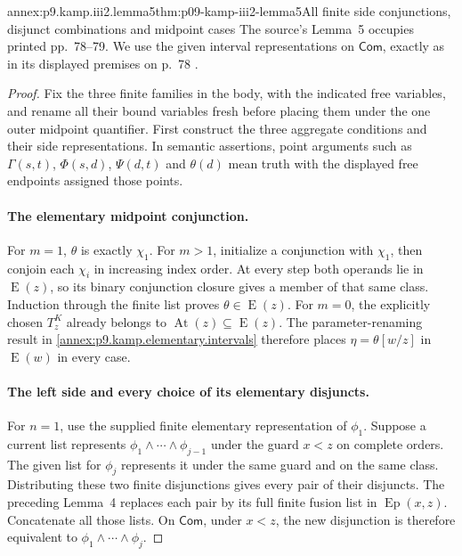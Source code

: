 \begin{annexitem}{annex:p9.kamp.iii2.lemma5}{thm:p09-kamp-iii2-lemma5}{All finite side conjunctions, disjunct combinations and midpoint cases}
The source's Lemma~5 occupies printed pp.~78--79. We use the given
interval representations on \(\mathsf{Com}\), exactly as in its
displayed premises on p.~78
\cite[ch.~III, pp.~78--79]{Kamp1968}.

\begin{proof}
Fix the three finite families in the body, with the indicated free
variables, and rename all their bound variables fresh before placing
them under the one outer midpoint quantifier. First construct the
three aggregate conditions and their side representations.
In semantic assertions, point arguments such as \(\Gamma(s,t)\),
\(\Phi(s,d)\), \(\Psi(d,t)\) and \(\theta(d)\) mean truth with
the displayed free endpoints assigned those points.

\paragraph{The elementary midpoint conjunction.}
For \(m=1\), \(\theta\) is exactly \(\chi_1\).
For \(m>1\), initialize a conjunction with \(\chi_1\), then conjoin
each \(\chi_i\) in increasing index order. At every step both
operands lie in \(\operatorname{E}(z)\), so its binary conjunction
closure gives a member of that same class. Induction through the
finite list proves \(\theta\in\operatorname{E}(z)\).
For \(m=0\), the explicitly chosen \(T^K_z\) already belongs to
\(\operatorname{At}(z)\subseteq\operatorname{E}(z)\).
The parameter-renaming result in
\cref{annex:p9.kamp.elementary.intervals} therefore places
\(\eta=\theta[w/z]\) in \(\operatorname{E}(w)\) in every case.

\paragraph{The left side and every choice of its elementary disjuncts.}
For \(n=1\), use the supplied finite elementary representation of
\(\phi_1\). Suppose a current list represents
\(\phi_1\land\cdots\land\phi_{j-1}\) under the guard \(x<z\)
on complete orders. The given list for \(\phi_j\) represents it
under the same guard and on the same class. Distributing these two
finite disjunctions gives every pair of their disjuncts. The preceding
Lemma~4 replaces each pair by its full finite fusion list in
\(\operatorname{Ep}(x,z)\). Concatenate all those lists. On
\(\mathsf{Com}\), under \(x<z\), the new disjunction is therefore
equivalent to \(\phi_1\land\cdots\land\phi_j\).


\end{proof}
\end{annexitem}
